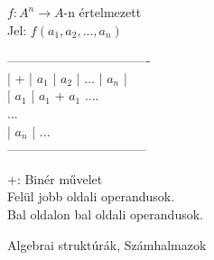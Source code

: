 \begin{frame}

\begin{tcolorbox}[title={Def.: $n$-változós művelet}]
$f : A^n \rightarrow A$-n értelmezett \\
Jel: $f(a_1, a_2, ..., a_n)$
\end{tcolorbox}

\begin{tcolorbox}[title={Def.: Műveleti tábla, Operandus}]
----------------------------------\\
|      +      |      $a_1$       |      $a_2$       | ... |      $a_n$      |\\
|    $a_1$    | $a_1$ + $a_1$ ....\\
...\\
| $a_n$ | ...\\
---------------------------------\\
\mmedskip

+: Binér művelet\\
Felül jobb oldali operandusok.\\
Bal oldalon bal oldali operandusok.
\end{tcolorbox}
\end{frame}


\begin{frame}[plain]
\begin{tcolorbox}[center, colback={myyellow}, coltext={black}, colframe={myyellow}]
    {\RHuge Algebrai struktúrák, Számhalmazok}
    \mmedskip
\end{tcolorbox}
\end{frame}


